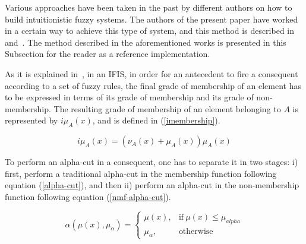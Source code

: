﻿\documentclass{ieeeaccess}
\begin{document}
Various approaches have been taken in the past by different authors on how to
build intuitionistic fuzzy systems. %
The authors of the present paper have worked in a certain way to achieve this type of system, 
and this method is described in~\cite{Hernandez-Aguila2016} and~\cite{Hernandez-Aguila2017-2}. %
The method described in the aforementioned works is presented in this Subsection for
the reader as a reference implementation.


As it is explained in~\cite{Hernandez-Aguila2016}, in an IFIS, in order for an
antecedent to fire a consequent according to a set of fuzzy rules, the final
grade of membership of an element has to be expressed in terms of its grade of
membership and its grade of non-membership. The resulting grade of membership of
an element belonging to $A$ is represented by $i\mu_{A}(x)$, and is defined in
(\ref{imembership}).

\begin{equation}
  \label{imembership}
  i\mu_{A}(x) = (\nu_{A}(x) + \mu_{A}(x))\mu_{A}(x)
\end{equation}

To perform an alpha-cut in a consequent, one has to separate it in two stages:
i) first, perform a traditional alpha-cut in the membership function following equation
(\ref{alpha-cut}), and then ii) perform an alpha-cut in the non-membership
function following equation (\ref{nmf-alpha-cut}).

\begin{equation}
  \label{alpha-cut}
  \alpha(\mu (x),\mu_{\alpha}) =
  \begin{cases}
    \mu (x), & \text{if}\ \mu (x) \leq \mu_{alpha}  \\
    \mu_{\alpha}, & \text{otherwise}
  \end{cases}
\end{equation}
\end{document}
